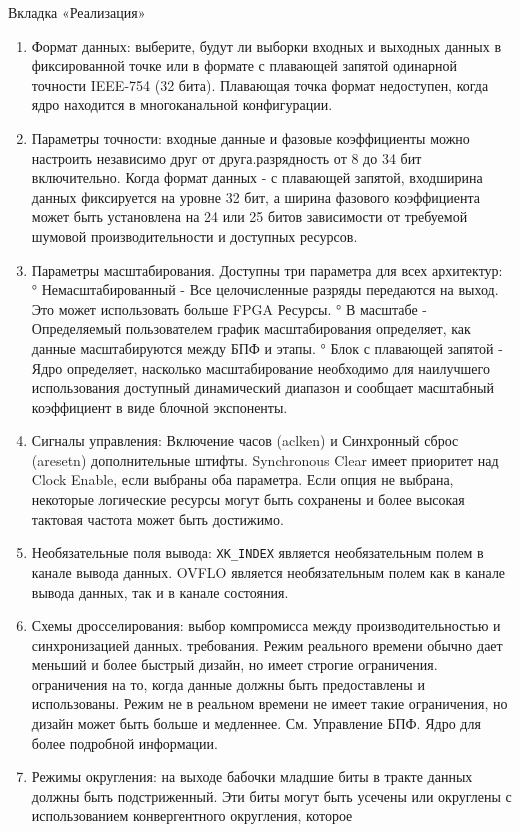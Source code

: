Вкладка «Реализация»
\begin{enumerate}
\item Формат данных: выберите, будут ли выборки входных и выходных данных в фиксированной точке или в формате с плавающей запятой одинарной точности IEEE-754 (32 бита). Плавающая точка
формат недоступен, когда ядро находится в многоканальной конфигурации.
\item Параметры точности: входные данные и фазовые коэффициенты можно настроить независимо друг от друга.разрядность от 8 до 34 бит включительно. Когда формат данных - с плавающей запятой, входширина данных фиксируется на уровне 32 бит, а ширина фазового коэффициента может быть установлена на 24 или 25 битов зависимости от требуемой шумовой производительности и доступных ресурсов.


\item Параметры масштабирования. Доступны три параметра для всех архитектур:
° Немасштабированный
- Все целочисленные разряды передаются на выход. Это может использовать больше FPGA Ресурсы.
° В масштабе
- Определяемый пользователем график масштабирования определяет, как данные масштабируются между БПФ и
этапы.
° Блок с плавающей запятой
- Ядро определяет, насколько масштабирование необходимо для наилучшего использования
доступный динамический диапазон и сообщает масштабный коэффициент в виде блочной экспоненты.
\item Сигналы управления: Включение часов (aclken) и Синхронный сброс (aresetn)
дополнительные штифты. Synchronous Clear имеет приоритет над Clock Enable, если выбраны оба параметра. Если
опция не выбрана, некоторые логические ресурсы могут быть сохранены и более высокая тактовая частота
может быть достижимо.
\item Необязательные поля вывода: \verb|XK_INDEX| является необязательным полем в канале вывода данных.
OVFLO является необязательным полем как в канале вывода данных, так и в канале состояния.
\item Схемы дросселирования: выбор компромисса между производительностью и синхронизацией данных.
требования. Режим реального времени обычно дает меньший и более быстрый дизайн, но имеет строгие ограничения.
ограничения на то, когда данные должны быть предоставлены и использованы. Режим не в реальном времени не имеет
такие ограничения, но дизайн может быть больше и медленнее. См. Управление БПФ.
Ядро для более подробной информации.
\item Режимы округления: на выходе бабочки младшие биты в тракте данных должны быть
подстриженный. Эти биты могут быть усечены или округлены с использованием конвергентного округления, которое

\end{enumerate}

